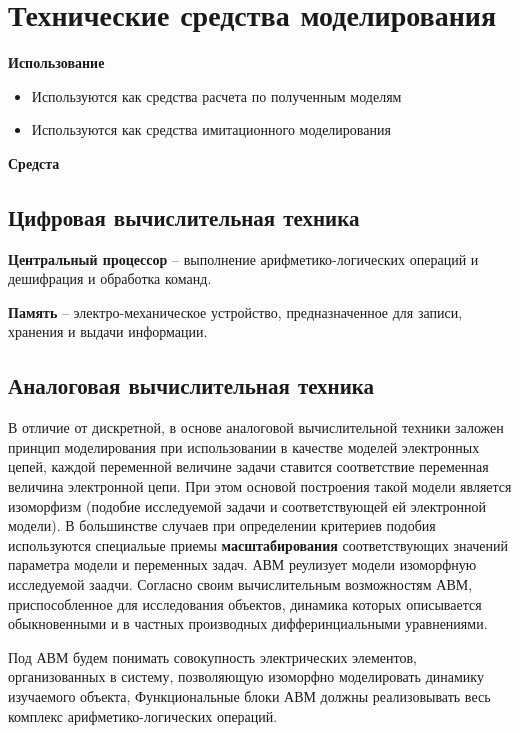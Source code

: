 \section{Технические средства моделирования}

\textbf{Использование}

\begin{itemize}
    \item Используются как средства расчета по полученным моделям
    \item Используются как средства имитационного моделирования
\end{itemize}

\textbf{Средста}

\subsection{Цифровая вычислительная техника}

\textbf{Центральный процессор} -- выполнение арифметико-логических операций и дешифрация и обработка команд.

\textbf{Память} -- электро-механическое устройство, предназначенное для записи, хранения и выдачи информации.

\subsection{Аналоговая вычислительная техника}

В отличие от дискретной, в основе аналоговой вычислительной техники заложен принцип моделирования при использовании в качестве моделей электронных цепей, каждой переменной величине задачи ставится соответствие переменная величина электронной цепи. При этом основой построения такой модели является изоморфизм (подобие исследуемой задачи и соответствующей ей электронной модели). В большинстве случаев при определении критериев подобия используются специальые приемы \textbf{масштабирования} соответствующих значений параметра модели и переменных задач. АВМ реулизует модели изоморфную исследуемой заадчи. Согласно своим вычислительным возможностям АВМ, приспособленное для исследования объектов, динамика которых описывается обыкновенными и в частных производных дифферинциальными уравнениями.

Под АВМ будем понимать совокупность электрических элементов, организованных в систему, позволяющую изоморфно моделировать динамику изучаемого объекта, Функциональные блоки АВМ должны реализовывать весь комплекс арифметико-логических операций.

